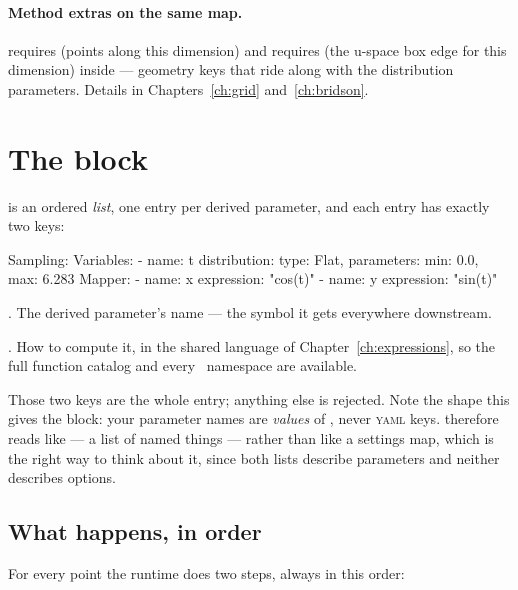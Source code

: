 \paragraph{Method extras on the same map.}  requires  (points
along this dimension) and  requires  (the u-space box
edge for this dimension) inside  --- geometry keys that
ride along with the distribution parameters. Details in
Chapters~\ref{ch:grid} and~\ref{ch:bridson}.

\section{The  block}
\label{sec:mapper}

 is an ordered \emph{list}, one entry per derived parameter, and each
entry has exactly two keys:

\begin{yamlwin}
Sampling:
  Variables:
    - name: t
      distribution: {type: Flat, parameters: {min: 0.0, max: 6.283}}
  Mapper:
    - name: x
      expression: "cos(t)"
    - name: y
      expression: "sin(t)"
\end{yamlwin}

\begin{keylist}
  \item[name] \req. The derived parameter's name --- the symbol it gets everywhere
        downstream.
  \item[expression] \req. How to compute it, in the shared language of
        Chapter~\ref{ch:expressions}, so the full function catalog and every \Operas\
        namespace are available.
\end{keylist}

Those two keys are the whole entry; anything else is rejected. Note the shape this
gives the block: your parameter names are \emph{values} of \yamlkey{name}, never
\textsc{yaml} keys. \yamlkey{Mapper} therefore reads like
 --- a list of named things --- rather than like a settings map, which
is the right way to think about it, since both lists describe parameters and neither
describes options.

\subsection{What happens, in order}
\label{sec:mapper-order}

For every point the runtime does two steps, always in this order:

